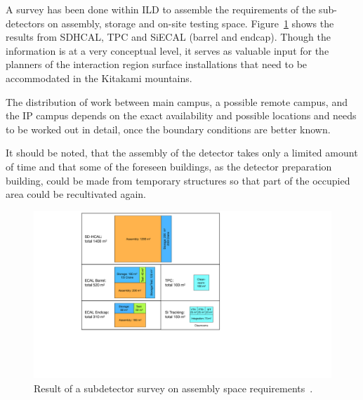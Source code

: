 A survey has been done within ILD to assemble the requirements of the sub-detectors on assembly, storage and on-site testing space. Figure~\ref{fig:integration:assembly_space} shows the results from SDHCAL, TPC and SiECAL (barrel and endcap). Though the information is at a very conceptual level, it serves as valuable input for the planners of the interaction region surface installations that need to be accommodated in the Kitakami mountains. 

The distribution of work between main campus, a possible remote campus, and the IP campus depends on the exact availability and possible locations and needs to be worked out in detail, once the boundary conditions are better known.

It should be noted, that the assembly of the detector takes only a limited amount of time and that some of the foreseen buildings, as the detector preparation building, could be made from temporary structures so that part of the occupied area could be recultivated again.

\begin{figure}[h!]
\centering
\includegraphics[width=0.8\hsize]{Integration/fig/Assembly_Space.pdf}
\caption{\label{fig:integration:assembly_space}Result of a subdetector survey on assembly space requirements~\cite{ild:bib:ejade_mdi,ild:bib:assembly}.}
\end{figure}

